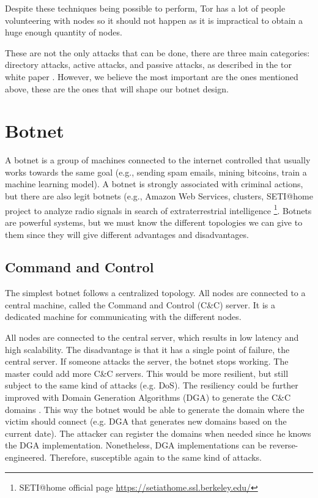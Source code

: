 \documentclass[11pt, a4paper,twoside]{tesi_upf}
\begin{document}
Despite these techniques being possible to perform, Tor has a lot of people volunteering with nodes so it should not happen as it is impractical to obtain a huge enough quantity of nodes.

These are not the only attacks that can be done, there are three main categories: directory attacks, active attacks, and passive attacks, as described in the tor white paper \cite{tor-whitepaper}. However, we believe the most important are the ones mentioned above, these are the ones that will shape our botnet design.

\section{Botnet}
\label{section:botnets}

A botnet is a group of machines connected to the internet controlled that usually works towards the same goal (e.g., sending spam emails, mining bitcoins, train a machine learning model). A botnet is strongly associated with criminal actions, but there are also legit botnets (e.g., Amazon Web Services, clusters, SETI@home project to analyze radio signals in search of extraterrestrial intelligence \footnote{SETI@home official page \url{https://setiathome.ssl.berkeley.edu/}}. Botnets are powerful systems, but we must know the different topologies we can give to them since they will give different advantages and disadvantages.


\subsection{Command and Control}

The simplest botnet follows a centralized topology. All nodes are connected to a central machine, called the Command and Control (C\&C) server. It is a dedicated machine for communicating with the different nodes.

All nodes are connected to the central server, which results in low latency and high scalability. The disadvantage is that it has a single point of failure, the central server. If someone attacks the server, the botnet stops working. The master could add more C\&C servers. This would be more resilient, but still subject to the same kind of attacks (e.g. DoS). The resiliency could be further improved with Domain Generation Algorithms (DGA) to generate the C\&C domains \cite{botnets}. This way the botnet would be able to generate the domain where the victim should connect (e.g. DGA that generates new domains based on the current date). The attacker can register the domains when needed since he knows the DGA implementation. Nonetheless, DGA implementations can be reverse-engineered. Therefore, susceptible again to the same kind of attacks.
\end{document}
